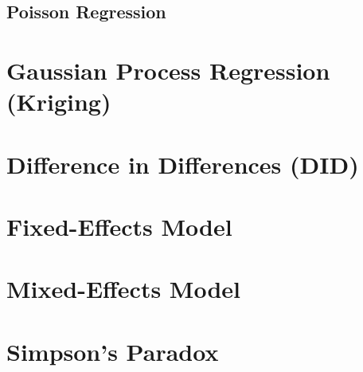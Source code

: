 \subsection{Poisson Regression}
\label{regression:GLM:poisson}

\section{Gaussian Process Regression (Kriging)}
\label{regression:kriging}


\section{Difference in Differences (DID)}
\label{regression:DID}

\section{Fixed-Effects Model}
\label{regression:fixed_effects}

\section{Mixed-Effects Model}
\label{regression:mixed_effects}

\section{Simpson's Paradox}
\label{regression:simpsons_paradox}
